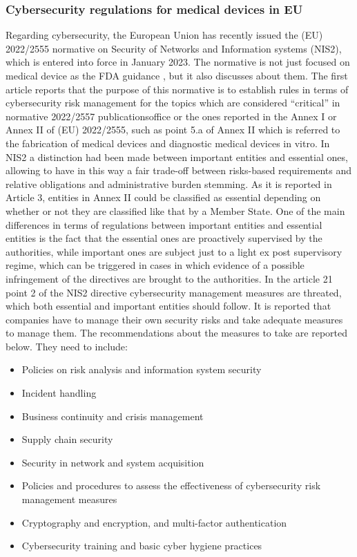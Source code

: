 \documentclass{Configuration_Files/PoliMi3i_thesis}
\begin{document}
\subsubsection{Cybersecurity regulations for medical devices in EU} 
Regarding cybersecurity, the European Union has recently issued the (EU) 2022/2555 \cite{DirectiveEU20222022} normative on Security of Networks and Information systems (NIS2), which is entered into force in January 2023. 
The normative is not just focused on medical device as the FDA guidance \cite{ContentPremarketSubmissions}, but it also discusses about them. The first article reports that the purpose of this normative is to establish rules in terms of cybersecurity risk management for the topics which are considered “critical” in normative 2022/2557 publicationsoffice or the ones reported in the Annex I or Annex II of (EU) 2022/2555, such as point 5.a of Annex II which is referred to the fabrication of medical devices and diagnostic medical devices in vitro. 
In NIS2 a distinction had been made between important entities and essential ones, allowing to have in this way a fair trade-off between risks-based requirements and relative obligations and administrative burden stemming. As it is reported in Article 3, entities in Annex II could be classified as essential depending on whether or not they are classified like that by a Member State.
One of the main differences in terms of regulations between important entities and essential entities is the fact that the essential ones are proactively supervised by the authorities, while important ones are subject just to a light ex post supervisory regime, which can be triggered in cases in which evidence of a possible infringement of the directives are brought to the authorities.
In the article 21 point 2 of the NIS2 directive cybersecurity management measures are threated, which both essential and important entities should follow. It is reported that companies have to manage their own security risks and take adequate measures to manage them. 
The recommendations about the measures to take are reported below. They need to include:
\begin{itemize}
	\item Policies on risk analysis and information system security 
	\item Incident handling
	\item Business continuity and crisis management
	\item Supply chain security
	\item Security in network and system acquisition
	\item Policies and procedures to assess the effectiveness of cybersecurity risk management measures
	\item Cryptography and encryption, and multi-factor authentication
	\item Cybersecurity training and basic cyber hygiene practices
\end{itemize}
\end{document}
